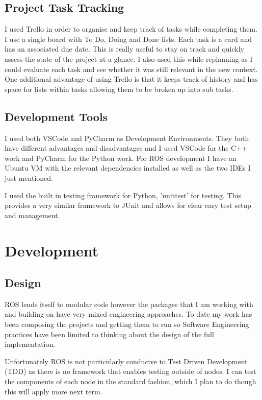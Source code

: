 \documentclass[]{../resources/final_report}
\begin{document}
\subsection{Project Task Tracking}
I used Trello in order to organise and keep track of tasks while completing them. I use a single 
board with To Do, Doing and Done lists. Each task is a card and has an associated due date.
This is really useful to stay on track and quickly assess the state of the project at a glance. 
I also used this while replanning as I could evaluate each task and see whether it was still 
relevant in the new context. One additional advantage of using Trello is that it keeps track of 
history and has space for lists within tasks allowing them to be broken up into sub tasks.


\subsection{Development Tools}

I used both VSCode and PyCharm as Development Environments. They both have different advantages 
and disadvantages and I used VSCode for the C++ work and PyCharm for the Python work.
For ROS development I have an Ubuntu VM with the relevant dependencies installed as well as the 
two IDEs I just mentioned.

I used the built in testing framework for Python, 'unittest' for testing. This provides a very 
similar framework to JUnit and allows for clear easy test setup and management.


\section{Development}

\subsection{Design}
ROS lends itself to modular code however the packages that I am working with and building on have 
very mixed engineering approaches. To date my work has been composing the projects and getting them 
to run so Software Engineering practices have been limited to thinking about the design of the full 
implementation.

Unfortunately ROS is not particularly conducive to Test Driven Development (TDD) as there is no 
framework that enables testing outside of nodes. I can test the components of each node in the 
standard fashion, which I plan to do though this will apply more next term.
\end{document}
